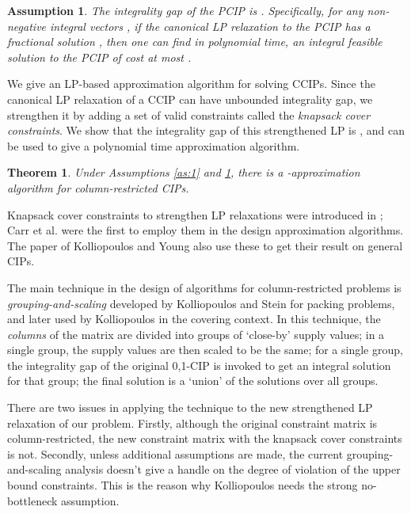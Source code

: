 \documentclass[11pt]{article}
\newtheorem{theorem}{Theorem}
\newtheorem{assumption}{Assumption}
\newcommand{\1}{\mathbb{1}}
\begin{document}
\begin{assumption}\label{as:2}
  The integrality gap of the PCIP is .  Specifically,
  for any non-negative integral vectors , if the canonical LP
  relaxation to the PCIP has a fractional solution , then one can
  find in polynomial time, an integral feasible solution to the PCIP
  of cost at most .
\end{assumption}

We give an LP-based approximation algorithm for solving CCIPs.  Since
the canonical LP relaxation of a CCIP can have unbounded integrality
gap, we strengthen it by adding a set of valid constraints called the
{\em knapsack cover constraints}.  We show that the integrality gap of
this strengthened LP is , and can be used to give
a polynomial time approximation algorithm.

\begin{theorem}\label{thm:1}
  Under Assumptions \ref{as:1} and \ref{as:2}, there is a
  -approximation algorithm for column-restricted
  CIPs. 
\end{theorem}

Knapsack cover constraints to strengthen LP relaxations were
introduced in \cite{B75,HJP75,Wo75}; Carr et al. \cite{CF+00} were the
first to employ them in the design approximation algorithms. The paper
of Kolliopoulos and Young \cite{KY05} also use these to get their
result on general CIPs.

The main technique in the design of algorithms for column-restricted
problems is {\em grouping-and-scaling} developed by Kolliopoulos and
Stein \cite{KS01,KS04} for packing problems, and later used by
Kolliopoulos \cite{Ko03} in the covering context.  In this technique,
the {\em columns} of the matrix are divided into groups of `close-by'
supply values; in a single group, the supply values are then scaled to
be the same; for a single group, the integrality gap of the original
0,1-CIP is invoked to get an integral solution for that group; the
final solution is a `union' of the solutions over all groups.

There are two issues in applying the technique to the new strengthened
LP relaxation of our problem.  Firstly, although the original
constraint matrix is column-restricted, the new constraint matrix with
the knapsack cover constraints is not.  Secondly, unless additional
assumptions are made, the current grouping-and-scaling analysis
doesn't give a handle on the degree of violation of the upper bound
constraints. This is the reason why Kolliopoulos \cite{Ko03} needs the
strong no-bottleneck assumption.
\end{document}

